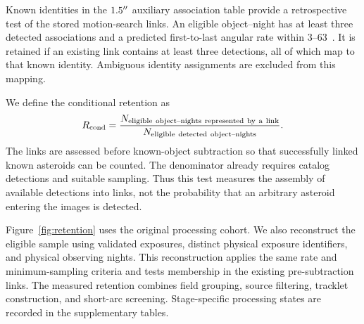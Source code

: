 \label{sec:retention_method}

Known identities in the $1.5^{\prime\prime}$ auxiliary association table provide a
retrospective test of the stored motion-search links. An eligible
object--night has at least three detected associations and a predicted
first-to-last angular rate within $3$--$63$~\rateunit. It is retained if
an existing link contains at least three detections, all of which map
to that known identity. Ambiguous identity assignments are excluded from this mapping.

We define the conditional retention as
\begin{equation}
R_{\rm cond} =
\frac{N_{\rm eligible\ object\text{--}nights\ represented\ by\ a\ link}}
     {N_{\rm eligible\ detected\ object\text{--}nights}}.
\label{eq:retention}
\end{equation}
The links are assessed before known-object subtraction so that
successfully linked known asteroids can be counted. The denominator
already requires catalog detections and suitable sampling. Thus this
test measures the assembly of available detections into links, not the
probability that an arbitrary asteroid entering the images is detected.

Figure~\ref{fig:retention} uses the original processing cohort.
We also reconstruct the eligible sample using validated exposures,
distinct physical exposure identifiers, and physical observing nights.
This reconstruction applies the same rate and minimum-sampling criteria
and tests membership in the existing pre-subtraction links.
The measured retention combines field grouping, source filtering,
tracklet construction, and short-arc screening. Stage-specific
processing states are recorded in the supplementary tables.
